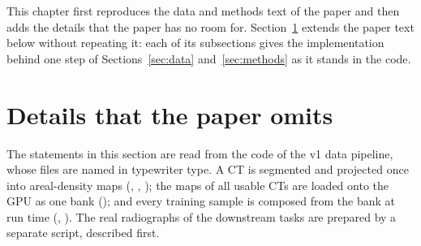 This chapter first reproduces the data and methods text of the paper and then adds the details that the paper has no room for.
Section~\ref{sec:dp-details} extends the paper text below without repeating it: each of its subsections gives the implementation behind one
step of Sections~\ref{sec:data} and~\ref{sec:methods} as it stands in the code.





\section{Details that the paper omits}
\label{sec:dp-details}
The statements in this section are read from the code of the v1 data pipeline, whose files are named in typewriter type. A CT is segmented and projected once into areal-density maps (,
, ); the maps of all usable CTs are loaded onto the GPU as one bank (); and every
training sample is composed from the bank at run time (, ). The real radiographs of the downstream tasks
are prepared by a separate script, described first.

